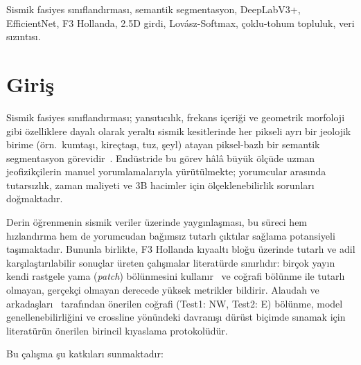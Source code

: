 \documentclass[conference,a4paper,10pt]{IEEEtran}
\begin{document}
\begin{IEEEkeywords}
Sismik fasiyes sınıflandırması, semantik segmentasyon, DeepLabV3+, EfficientNet, F3 Hollanda,
2.5D girdi, Lovász-Softmax, çoklu-tohum topluluk, veri sızıntısı.
\end{IEEEkeywords}

\section{Giriş}
\label{sec:giris}

Sismik fasiyes sınıflandırması; yansıtıcılık, frekans içeriği ve geometrik morfoloji gibi
özelliklere dayalı olarak yeraltı sismik kesitlerinde her pikseli ayrı bir jeolojik birime
(örn.\ kumtaşı, kireçtaşı, tuz, şeyl) atayan piksel-bazlı bir semantik segmentasyon
görevidir~\cite{alaudah2019}. Endüstride bu görev hâlâ büyük ölçüde uzman jeofizikçilerin
manuel yorumlamalarıyla yürütülmekte; yorumcular arasında tutarsızlık, zaman maliyeti ve
3B hacimler için ölçeklenebilirlik sorunları doğmaktadır.

Derin öğrenmenin sismik veriler üzerinde yaygınlaşması, bu süreci hem hızlandırma hem de
yorumcudan bağımsız tutarlı çıktılar sağlama potansiyeli taşımaktadır. Bununla birlikte,
F3 Hollanda kıyaaltı bloğu üzerinde tutarlı ve adil karşılaştırılabilir sonuçlar üreten
çalışmalar literatürde sınırlıdır: birçok yayın kendi rastgele yama (\emph{patch}) bölünmesini
kullanır~\cite{abid2022, conss2023} ve coğrafi bölünme ile tutarlı olmayan, gerçekçi
olmayan derecede yüksek metrikler bildirir. Alaudah ve arkadaşları~\cite{alaudah2019}
tarafından önerilen coğrafi (Test1: NW, Test2: E) bölünme, model genellenebilirliğini ve
crossline yönündeki davranışı dürüst biçimde sınamak için literatürün önerilen birincil
kıyaslama protokolüdür.

Bu çalışma şu katkıları sunmaktadır:
\end{document}

